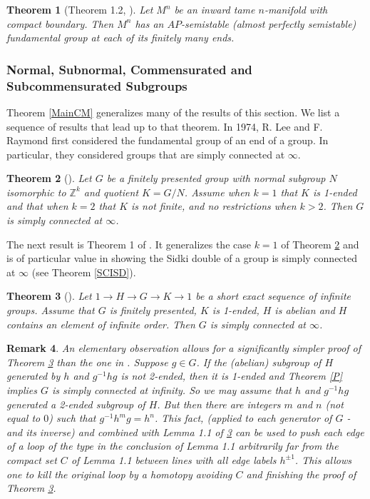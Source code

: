 \documentclass[12pt]{article}
\newtheorem{theorem}{Theorem}[subsection]
\newtheorem{remark}[theorem]{Remark}
\begin{document}
\begin{theorem} [Theorem 1.2, \cite{GuTi}] Let $M^n$ be an inward tame $n$-manifold with compact boundary. Then
$M^n$ has an $AP$-semistable (almost perfectly semistable) fundamental group at each
of its finitely many ends.
\end{theorem} 


\subsubsection{Normal, Subnormal, Commensurated and Subcommensurated Subgroups}\label{SubCom} Theorem \ref{MainCM} generalizes many of the results of this section. We list a sequence of results that lead up to that theorem. 
In 1974,   R. Lee and F. Raymond first considered the fundamental group of an end of a group. In particular, they considered groups that are simply connected at $\infty$. 

\begin{theorem}  [\cite{LR75}] \label{LR} Let $G$ be a finitely presented group with normal subgroup $N$ isomorphic to $\mathbb Z^k$ and quotient $K= G/N$. Assume when $k=1$ that $K$ is 1-ended and that when $k=2$ that $K$ is not finite, and no restrictions when $k>2$. Then $G$ is simply connected at $\infty$. 
\end{theorem}


The next result is Theorem 1 of \cite{M87a}. It generalizes the case $k=1$ of Theorem \ref{LR} and is of particular value in showing the Sidki double of a group is simply connected at $\infty$ (see Theorem \ref{SCISD}).

\begin{theorem} [\cite{M87a}] \label{T187a} Let $1\to H\to G\to K\to 1$ be a short exact sequence of infinite groups. Assume that $G$ is finitely presented, $K$ is 1-ended, $H$ is abelian and $H$ contains an element of infinite order. Then $G$ is simply connected at $\infty$.
\end{theorem}

\begin{remark}
An elementary observation allows for a significantly simpler proof of Theorem \ref{T187a} than the one in \cite{M87a}. Suppose $g\in G$. If the (abelian) subgroup of $H$ generated by $h$ and $g^{-1}hg$ is not 2-ended, then it is 1-ended and Theorem \ref{P} implies $G$ is simply connected at infinity. So we may assume that $h$ and $g^{-1}hg$ generated a 2-ended subgroup of $H$. But then there are integers $m$ and $n$ (not equal to $0$) such that $g^{-1}h^mg=h^n$. 
This fact, (applied to each generator of $G$ - and its inverse) and combined with Lemma 1.1 of \ref{T187a} can be used to push each edge of a loop of the type in the conclusion of Lemma 1.1 arbitrarily far from the compact set $C$ of Lemma 1.1 between lines with all edge labels $h^{\pm 1}$. This allows one to kill the original loop by a homotopy avoiding $C$ and finishing the proof of Theorem \ref{T187a}. 
\end{remark}
\end{document}
